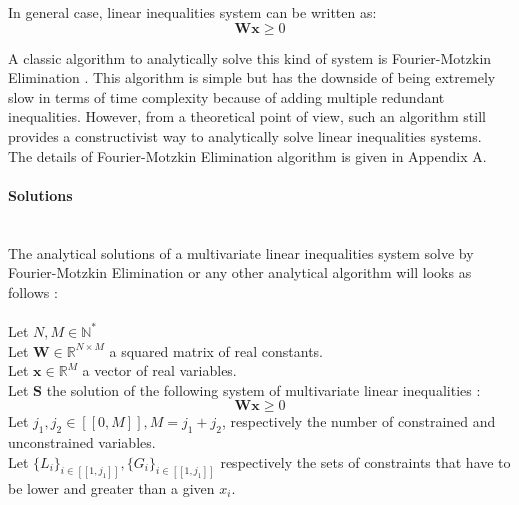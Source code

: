 \documentclass{article}
\begin{document}
In general case, linear inequalities system can be written as: 
\begin{equation*}
\textbf{W}\textbf{x}\geqslant0 
\end{equation*}

A classic algorithm to analytically solve this kind of system is Fourier-Motzkin Elimination \cite{motzkin1952theory}.
This algorithm is simple but has the downside of being extremely slow in terms of time complexity because of adding multiple redundant 
inequalities. However, from a theoretical point of view, such an algorithm still provides a constructivist way to analytically solve linear inequalities
systems. \\ The details of Fourier-Motzkin Elimination algorithm is given in Appendix A.

\paragraph{Solutions} \ \\  

The analytical solutions of a multivariate linear inequalities system solve by Fourier-Motzkin Elimination or any other analytical algorithm will 
looks as follows :\\\\
Let $N,M \in \mathbb{N}^{*}$\\
Let $\textbf{W} \in \mathbb{R}^{N \times M}$ a squared matrix of real constants.\\
Let $\textbf{x} \in \mathbb{R}^{M}$ a vector of real variables.\\
Let $\textbf{S}$ the solution of the following system of multivariate linear inequalities : 
\begin{equation*}
    \textbf{W}\textbf{x}\geqslant0
\end{equation*}
Let $j_{1},j_{2} \in [\![0,M]\!], M = j_{1} +j_{2} $, respectively the number of constrained and unconstrained variables.\\
Let $\{L_{i}\}_{i \in [\![1,j_{1}]\!]},\{G_{i}\}_{i \in [\![1,j_{1}]\!]}$ respectively 
the sets of constraints that have to be lower and greater than a given $x_{i}$.
\end{document}
